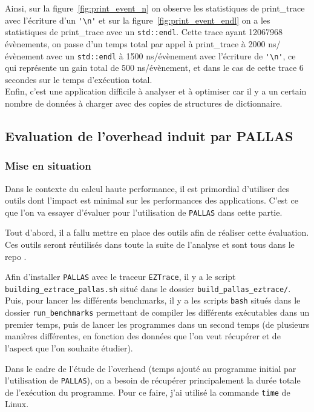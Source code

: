Ainsi, sur la figure~\ref{fig:print_event_n} on observe les statistiques de print\_trace avec l'écriture d'un \verb!'\n'! et sur la figure~\ref{fig:print_event_endl} on a les statistiques de print\_trace avec un \verb!std::endl!.
Cette trace ayant 12067968 évènements, on passe d'un temps total par appel à print\_trace à 2000 ns/évènement avec un \verb!std::endl! à 1500 ns/évènement avec l'écriture de \verb!'\n'!, ce qui représente un gain
total de 500 ns/évènement, et dans le cas de cette trace 6 secondes sur le temps d'exécution total.\\
Enfin, c'est une application difficile à analyser et à optimiser car il y a un certain nombre de données à charger avec des copies de structures de dictionnaire.


\subsection{Evaluation de l'overhead induit par PALLAS}\label{ssec:overhead}
\subsubsection{Mise en situation}\label{ssec:overhead_context}

Dans le contexte du calcul haute performance, il est primordial d'utiliser des outils dont l'impact est minimal sur les performances des applications.
C'est ce que l'on va essayer d'évaluer pour l'utilisation de \verb!PALLAS! dans cette partie.

Tout d'abord, il a fallu mettre en place des outils afin de réaliser cette évaluation. Ces outils seront réutilisés dans toute la suite de l'analyse et sont tous dans le repo \cite{pallas-analysis}.

Afin d'installer \verb!PALLAS! avec le traceur \verb!EZTrace!, il y a le script \verb!building_eztrace_pallas.sh! situé dans le dossier \verb!build_pallas_eztrace/!.
Puis, pour lancer les différents benchmarks, il y a les scripts \verb!bash! situés dans le dossier \verb!run_benchmarks! permettant de compiler les différents
exécutables dans un premier temps, puis de lancer les programmes dans un second temps (de plusieurs manières différentes, en fonction des données que l'on veut récupérer et de l'aspect que l'on souhaite étudier).

Dans le cadre de l'étude de l'overhead (temps ajouté au programme initial par l'utilisation de \verb!PALLAS!), on a besoin de récupérer principalement la durée totale de l'exécution du programme.
Pour ce faire, j'ai utilisé la commande \verb!time! de Linux.

